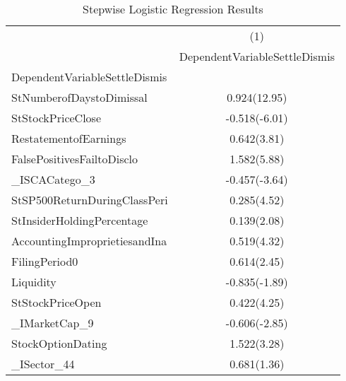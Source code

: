 \clearpage

\begin{table}[H]
\footnotesize
\centering 
\caption{Stepwise Logistic Regression Results}
\label{stepwiselogistic}
\begin{tabular}{l*{1}{c}} \hline\hline
                    &\multicolumn{1}{c}{(1)}\\
                    &\multicolumn{1}{c}{DependentVariableSettleDismis}\\
\hline
DependentVariableSettleDismis&            \\
StNumberofDaystoDimissal&       0.924(12.95)\\
                    
StStockPriceClose   &      -0.518(-6.01)\\
                
RestatementofEarnings&       0.642(3.81)\\
                    
FalsePositivesFailtoDisclo&       1.582(5.88)\\
                    
\_ISCACatego\_3       &      -0.457(-3.64)\\
                   
StSP500ReturnDuringClassPeri&       0.285(4.52)\\
                 
StInsiderHoldingPercentage&       0.139(2.08)\\
                   
AccountingImproprietiesandIna&       0.519(4.32)\\
                    
FilingPeriod0       &       0.614(2.45)\\
             
Liquidity           &      -0.835(-1.89)\\
                    
StStockPriceOpen    &       0.422(4.25)\\
                    
\_IMarketCap\_9       &      -0.606(-2.85)\\
                    
StockOptionDating   &       1.522(3.28)\\
                    
\_ISector\_44         &       0.681(1.36)\\
                    

\end{tabular}
\end{table}
